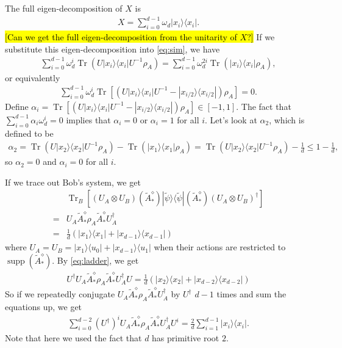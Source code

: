 \documentclass[11pt,letterpaper]{article}
\newcommand{\ketbra}[2]{|#1\rangle\langle#2|}
\newcommand{\x}{\otimes}
\DeclareMathOperator{\Tr}{Tr}
\DeclareMathOperator{\supp}{supp}
\newcommand{\1}{\mathbb{1}}
\newcommand{\tA}{\tilde{A}}
\newcommand{\tpsi}{\tilde{\psi}}
\theoremstyle{definition}
\begin{document}
The full eigen-decomposition of $X$ is
\begin{align}
	X = \sum_{i=0}^{d-1} \omega_d \ketbra{x_i}{x_i}.
\end{align}
\hl{[Can we get the full eigen-decomposition from the unitarity of $X$?]}
If we substitute this eigen-decomposition into \cref{eq:sim}, we have 
\begin{align}
	\sum_{i=0}^{d-1} \omega_d^i \Tr( U\ketbra{x_i}{x_i}U^{-1} \rho_A) = \sum_{i=0}^{d-1} \omega_d^{2i} \Tr(\ketbra{x_i}{x_i}\rho_A),
\end{align}
or equivalently
\begin{align}
	\sum_{i=0}^{d-1} \omega_d^i \Tr\left[ \left(U\ketbra{x_i}{x_i}U^{-1}- \ketbra{x_{i/2}}{x_{i/2}}\right) \rho_A\right] =0.
\end{align}
Define $\alpha_i = \Tr\left[ \left(U\ketbra{x_i}{x_i}U^{-1}- \ketbra{x_{i/2}}{x_{i/2}}\right) \rho_A\right] \in [-1, 1] $.
The fact that $\sum_{i=0}^{d-1} \alpha_i  \omega_d^i = 0$ implies that 
$\alpha_i = 0$ or $\alpha_i = 1$ for all $i$.
Let's look at $\alpha_2$, which is defined to be
\begin{align}
	 \alpha_2 = \Tr( U\ketbra{x_2}{x_2}U^{-1} \rho_A ) - \Tr(\ketbra{x_1}{x_1}\rho_A) 
	 = \Tr( U\ketbra{x_2}{x_2}U^{-1} \rho_A ) - \frac{1}{d} 
	 \leq 1 - \frac{1}{d},
\end{align}
so $\alpha_2 = 0$ and $\alpha_i = 0$ for all $i$.



If we trace out Bob's system, we get 
\begin{align}
	&\Tr_B\left[ (U_A\x U_B)(\tA_\ast^\diamond) \ketbra{\tpsi}{\tpsi} (\tA_\ast^\diamond) (U_A\x U_B)^\dagger\right]\\
	=& U_A \tA_\ast^\diamond \rho_A \tA_\ast^\diamond U_A^\dagger\\
	=& \frac{1}{d}( \ketbra{x_1}{x_1} + \ketbra{x_{d-1}}{x_{d-1}})
\end{align}
where $U_A =U_B = \ketbra{x_1}{u_0} + \ketbra{x_{d-1}}{u_1}$ when their actions are restricted to 
$\supp(\tA_\ast^\diamond)$.
By \cref{eq:ladder}, we get 
\begin{align}
	U^\dagger U_A \tA_\ast^\diamond \rho_A \tA_\ast^\diamond U_A^\dagger U = \frac{1}{d}( \ketbra{x_2}{x_2} + \ketbra{x_{d-2}}{x_{d-2}})
\end{align}
So if we repeatedly conjugate $U_A \tA_\ast^\diamond \rho_A \tA_\ast^\diamond U_A^\dagger$ by $U^\dagger$ $d-1$ times and sum the equations up, we get 
\begin{align}
	\sum_{i=0}^{d-2} (U^\dagger)^i U_A \tA_\ast^\diamond \rho_A \tA_\ast^\diamond U_A^\dagger U^i
	= \frac{2}{d} \sum_{i=1}^{d-1} \ketbra{x_i}{x_i}.
\end{align}
Note that here we used the fact that $d$ has primitive root $2$.
\end{document}
